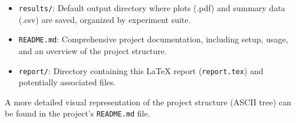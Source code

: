 \documentclass[12pt]{article}
\begin{document}
\begin{itemize}
\begin{itemize}
  \end{itemize}
  
  \item \texttt{results/}: Default output directory where plots (.pdf) and summary data (.csv) are saved, organized by experiment suite.
  
  \item \texttt{README.md}: Comprehensive project documentation, including setup, usage, and an overview of the project structure.
  
  \item \texttt{report/}: Directory containing this LaTeX report (\texttt{report.tex}) and potentially associated files.
\end{itemize}

A more detailed visual representation of the project structure (ASCII tree) can be found in the project's \texttt{README.md} file.
\end{document}
